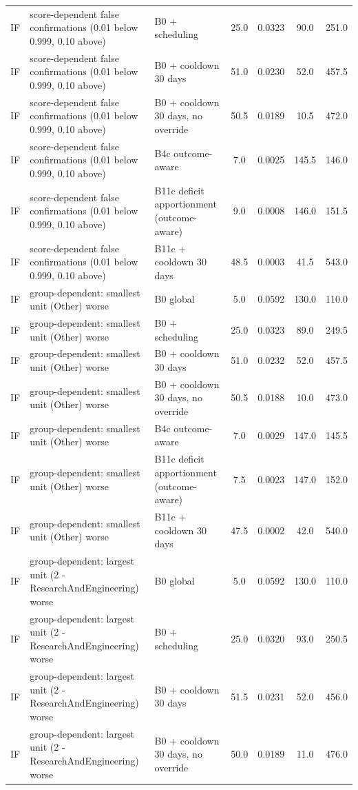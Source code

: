\documentclass[10pt,onecolumn,letterpaper]{article}
\begin{document}
\begin{longtable}{lp{5.2cm}p{4.4cm}cccc}
IF & score-dependent false confirmations (0.01 below 0.999, 0.10 above) & B0 + scheduling & 25.0 & 0.0323 & 90.0 & 251.0 \\
IF & score-dependent false confirmations (0.01 below 0.999, 0.10 above) & B0 + cooldown 30 days & 51.0 & 0.0230 & 52.0 & 457.5 \\
IF & score-dependent false confirmations (0.01 below 0.999, 0.10 above) & B0 + cooldown 30 days, no override & 50.5 & 0.0189 & 10.5 & 472.0 \\
IF & score-dependent false confirmations (0.01 below 0.999, 0.10 above) & B4c outcome-aware & 7.0 & 0.0025 & 145.5 & 146.0 \\
IF & score-dependent false confirmations (0.01 below 0.999, 0.10 above) & B11c deficit apportionment (outcome-aware) & 9.0 & 0.0008 & 146.0 & 151.5 \\
IF & score-dependent false confirmations (0.01 below 0.999, 0.10 above) & B11c + cooldown 30 days & 48.5 & 0.0003 & 41.5 & 543.0 \\
IF & group-dependent: smallest unit (Other) worse & B0 global & 5.0 & 0.0592 & 130.0 & 110.0 \\
IF & group-dependent: smallest unit (Other) worse & B0 + scheduling & 25.0 & 0.0323 & 89.0 & 249.5 \\
IF & group-dependent: smallest unit (Other) worse & B0 + cooldown 30 days & 51.0 & 0.0232 & 52.0 & 457.5 \\
IF & group-dependent: smallest unit (Other) worse & B0 + cooldown 30 days, no override & 50.5 & 0.0188 & 10.0 & 473.0 \\
IF & group-dependent: smallest unit (Other) worse & B4c outcome-aware & 7.0 & 0.0029 & 147.0 & 145.5 \\
IF & group-dependent: smallest unit (Other) worse & B11c deficit apportionment (outcome-aware) & 7.5 & 0.0023 & 147.0 & 152.0 \\
IF & group-dependent: smallest unit (Other) worse & B11c + cooldown 30 days & 47.5 & 0.0002 & 42.0 & 540.0 \\
IF & group-dependent: largest unit (2 - ResearchAndEngineering) worse & B0 global & 5.0 & 0.0592 & 130.0 & 110.0 \\
IF & group-dependent: largest unit (2 - ResearchAndEngineering) worse & B0 + scheduling & 25.0 & 0.0320 & 93.0 & 250.5 \\
IF & group-dependent: largest unit (2 - ResearchAndEngineering) worse & B0 + cooldown 30 days & 51.5 & 0.0231 & 52.0 & 456.0 \\
IF & group-dependent: largest unit (2 - ResearchAndEngineering) worse & B0 + cooldown 30 days, no override & 50.0 & 0.0189 & 11.0 & 476.0 \\

\end{longtable}
\end{document}
